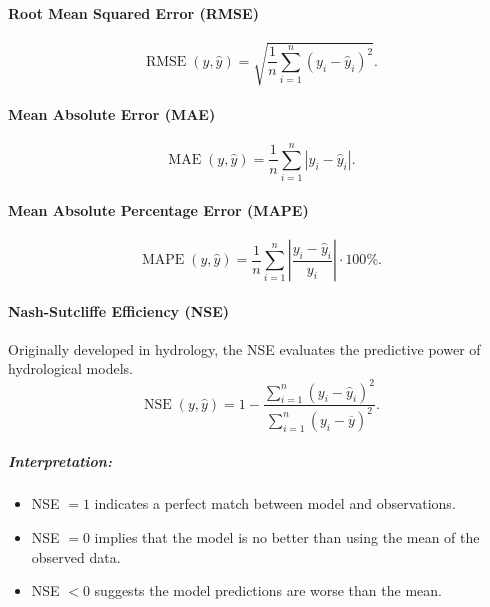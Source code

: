 \documentclass{article}
\newcommand{\RMSE}[2]{\operatorname{RMSE}{\left(#1, #2\right)}}
\newcommand{\MAE}[2]{\operatorname{MAE}{\left(#1, #2\right)}}
\newcommand{\MAPE}[2]{\operatorname{MAPE}{\left(#1, #2\right)}}
\newcommand{\NSE}[2]{\operatorname{NSE}{\left(#1, #2\right)}}
\begin{document}
\paragraph{Root Mean Squared Error (RMSE)}
\begin{equation}
    \RMSE{y}{\widehat{y}} = \sqrt{\frac{1}{n} \sum_{i=1}^{n} \left(y_i - \widehat{y}_i\right)^2}.
    \label{metric:rmse}
    \tag{RMSE}
\end{equation}

\paragraph{Mean Absolute Error (MAE)}
\begin{equation}
    \MAE{y}{\widehat{y}} = \frac{1}{n} \sum_{i=1}^{n} \left|y_i - \widehat{y}_i\right|.
    \label{metric:mae}
    \tag{MAE}
\end{equation}

\paragraph{Mean Absolute Percentage Error (MAPE)}
\begin{equation}
    \MAPE{y}{\widehat{y}}
    = \frac{1}{n} \sum_{i=1}^{n} \left| \frac{y_i - \widehat{y}_i}{y_i} \right| \cdot 100\%.
    \label{metric:mape}
    \tag{MAPE}
\end{equation}

\paragraph{Nash-Sutcliffe Efficiency (NSE)}
Originally developed in hydrology, the NSE evaluates the predictive power of hydrological models.
\begin{equation}
    \NSE{y}{\widehat{y}} = 1 - \frac{\sum_{i=1}^{n} \left( y_i - \widehat{y}_i \right)^2}{\sum_{i=1}^{n} \left( y_i - \overline{y} \right)^2}.
    \label{metric:nse}
    \tag{NSE}
\end{equation}

\subparagraph{Interpretation:}
\begin{itemize}
    \item NSE \( = 1 \) indicates a perfect match between model and observations.
    \item NSE \( = 0 \) implies that the model is no better than using the mean of the observed data.
    \item NSE \( < 0 \) suggests the model predictions are worse than the mean.
\end{itemize}
\end{document}
